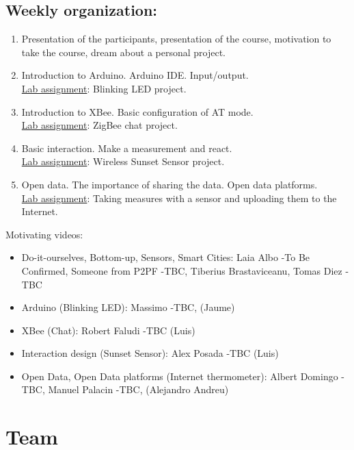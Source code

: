 \documentclass{tufte-book} %
\begin{document}
\section{Weekly organization:}
\begin{enumerate}
\item Presentation of the participants, presentation of the course, motivation to take the course, dream about a personal project.
\item Introduction to Arduino. Arduino IDE. Input/output. \\\underline{Lab assignment}: Blinking LED project.
\item Introduction to XBee. Basic configuration of AT mode. \\\underline{Lab assignment}: ZigBee chat project.
\item Basic interaction. Make a measurement and react. \\\underline{Lab assignment}: Wireless Sunset Sensor project.
\item Open data. The importance of sharing the data. Open data platforms. \\\underline{Lab assignment}: Taking measures with a sensor and uploading them to the Internet.
\end{enumerate}

Motivating videos:
\begin{itemize}
\item Do-it-ourselves, Bottom-up, Sensors, Smart Cities:
Laia Albo -To Be Confirmed, Someone from P2PF -TBC, Tiberius Brastaviceanu, Tomas Diez -TBC

\item Arduino (Blinking LED):
Massimo -TBC, (Jaume)

\item XBee (Chat):
Robert Faludi -TBC (Luis)

\item Interaction design (Sunset Sensor):
Alex Posada -TBC (Luis)

\item Open Data, Open Data platforms (Internet thermometer):
Albert Domingo -TBC, Manuel Palacin -TBC, (Alejandro Andreu)
\end{itemize}



\chapter{Team}
\end{document}
